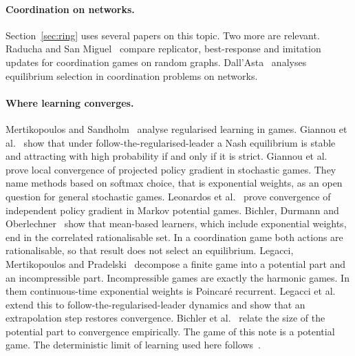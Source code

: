 \documentclass[11pt,a4paper]{article}
\theoremstyle{definition}
\theoremstyle{plain}
\begin{document}
\paragraph{Coordination on networks.}
Section~\ref{sec:ring} uses several papers on this topic. Two more are relevant. Raducha and San Miguel~\cite{raducha2022} compare replicator, best-response and imitation updates for coordination games on random graphs. Dall'Asta~\cite{dallasta2021} analyses equilibrium selection in coordination problems on networks.

\paragraph{Where learning converges.}
Mertikopoulos and Sandholm~\cite{mertikopoulos2016} analyse regularised learning in games. Giannou et al.~\cite{giannou2021} show that under follow-the-regularised-leader a Nash equilibrium is stable and attracting with high probability if and only if it is strict. Giannou et al.~\cite{giannou2022} prove local convergence of projected policy gradient in stochastic games. They name methods based on softmax choice, that is exponential weights, as an open question for general stochastic games. Leonardos et al.~\cite{leonardos2022} prove convergence of independent policy gradient in Markov potential games. Bichler, Durmann and Oberlechner~\cite{bichler2024} show that mean-based learners, which include exponential weights, end in the correlated rationalisable set. In a coordination game both actions are rationalisable, so that result does not select an equilibrium. Legacci, Mertikopoulos and Pradelski~\cite{legacci2024} decompose a finite game into a potential part and an incompressible part. Incompressible games are exactly the harmonic games. In them continuous-time exponential weights is Poincar\'e recurrent. Legacci et al.~\cite{legacci2024b} extend this to follow-the-regularised-leader dynamics and show that an extrapolation step restores convergence. Bichler et al.~\cite{bichler2025} relate the size of the potential part to convergence empirically. The game of this note is a potential game. The deterministic limit of learning used here follows~\cite{sato2003,bloembergen2015,barfuss2019}.
\end{document}
